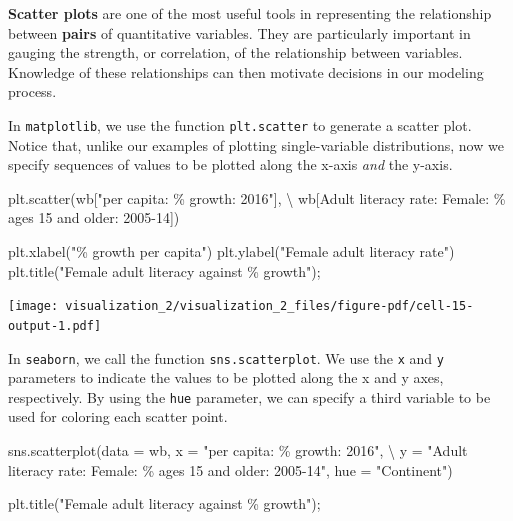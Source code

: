 \documentclass[
  letterpaper,
  DIV=11,
  numbers=noendperiod]{scrreprt}
\newenvironment{Shaded}{\begin{snugshade}}{\end{snugshade}}
\newcommand{\NormalTok}[1]{\textcolor[rgb]{0.00,0.23,0.31}{#1}}
\newcommand{\OperatorTok}[1]{\textcolor[rgb]{0.37,0.37,0.37}{#1}}
\newcommand{\SpecialCharTok}[1]{\textcolor[rgb]{0.37,0.37,0.37}{#1}}
\newcommand{\StringTok}[1]{\textcolor[rgb]{0.13,0.47,0.30}{#1}}
\begin{document}
\textbf{Scatter plots} are one of the most useful tools in representing
the relationship between \textbf{pairs} of quantitative variables. They
are particularly important in gauging the strength, or correlation, of
the relationship between variables. Knowledge of these relationships can
then motivate decisions in our modeling process.

In \texttt{matplotlib}, we use the function \texttt{plt.scatter} to
generate a scatter plot. Notice that, unlike our examples of plotting
single-variable distributions, now we specify sequences of values to be
plotted along the x-axis \emph{and} the y-axis.

\begin{Shaded}
\begin{Highlighting}[]
\NormalTok{plt.scatter(wb[}\StringTok{"per capita: }\SpecialCharTok{\% g}\StringTok{rowth: 2016"}\NormalTok{], }\OperatorTok{\textbackslash{}}
\NormalTok{            wb[}\StringTok{\textquotesingle{}Adult literacy rate: Female: \% ages 15 and older: 2005{-}14\textquotesingle{}}\NormalTok{])}

\NormalTok{plt.xlabel(}\StringTok{"}\SpecialCharTok{\% g}\StringTok{rowth per capita"}\NormalTok{)}
\NormalTok{plt.ylabel(}\StringTok{"Female adult literacy rate"}\NormalTok{)}
\NormalTok{plt.title(}\StringTok{"Female adult literacy against }\SpecialCharTok{\% g}\StringTok{rowth"}\NormalTok{)}\OperatorTok{;}
\end{Highlighting}
\end{Shaded}

\texttt{[image: visualization\_2/visualization\_2\_files/figure-pdf/cell-15-output-1.pdf]}

In \texttt{seaborn}, we call the function \texttt{sns.scatterplot}. We
use the \texttt{x} and \texttt{y} parameters to indicate the values to
be plotted along the x and y axes, respectively. By using the
\texttt{hue} parameter, we can specify a third variable to be used for
coloring each scatter point.

\begin{Shaded}
\begin{Highlighting}[]
\NormalTok{sns.scatterplot(data }\OperatorTok{=}\NormalTok{ wb, x }\OperatorTok{=} \StringTok{"per capita: }\SpecialCharTok{\% g}\StringTok{rowth: 2016"}\NormalTok{, }\OperatorTok{\textbackslash{}}
\NormalTok{               y }\OperatorTok{=} \StringTok{"Adult literacy rate: Female: \% ages 15 and older: 2005{-}14"}\NormalTok{, }
\NormalTok{               hue }\OperatorTok{=} \StringTok{"Continent"}\NormalTok{)}

\NormalTok{plt.title(}\StringTok{"Female adult literacy against }\SpecialCharTok{\% g}\StringTok{rowth"}\NormalTok{)}\OperatorTok{;}
\end{Highlighting}
\end{Shaded}
\end{document}

